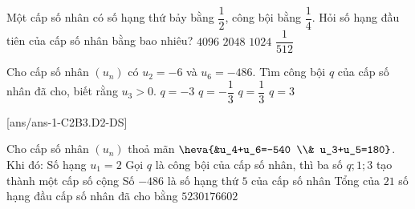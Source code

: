 \begin{ex}%
	Một cấp số nhân có số hạng thứ bảy bằng $\dfrac{1}{2}$, công bội bằng $\dfrac{1}{4}$. Hỏi số hạng đầu tiên của cấp số nhân bằng bao nhiêu?
	\choice
	{$4096$}
	{\True $2048$}
	{$1024$}
	{$\dfrac{1}{512}$}
\end{ex}
\begin{ex}%
	Cho cấp số nhân $(u_n)$ có $u_2=-6$ và $u_6=-486$. Tìm công bội $q$ của cấp số nhân đã cho, biết rằng $u_3>0$. 
	\choice
	{$q=-3$}
	{$q=-\dfrac{1}{3}$}
	{$q=\dfrac{1}{3}$}
	{\True $q=3$}
\end{ex}


\cauds
{}[ans/ans-1-C2B3.D2-DS]
\begin{ex}%
	Cho cấp số nhân ${\left(u_n\right)}$ thoả mãn $\heva{&u_4+u_6=-540 \\& u_3+u_5=180}$. Khi đó:
	\choiceTF
	{\True Số hạng $u_1=2$}
	{Gọi $q$ là công bội của cấp số nhân, thì ba số $q;1;3$ tạo thành một cấp số cộng}
	{Số $-486$ là số hạng thứ $5$ của cấp số nhân }
	{\True Tổng của $21$ số hạng đầu cấp số nhân đã cho bằng $5230176602$}
	
	
\end{ex}

